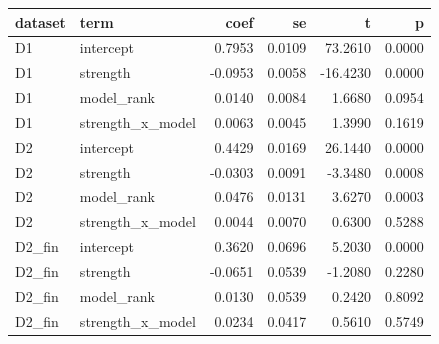 \begin{tabular}{llrrrr}
\toprule
dataset & term & coef & se & t & p \\
\midrule
D1 & intercept & 0.7953 & 0.0109 & 73.2610 & 0.0000 \\
D1 & strength & -0.0953 & 0.0058 & -16.4230 & 0.0000 \\
D1 & model\_rank & 0.0140 & 0.0084 & 1.6680 & 0.0954 \\
D1 & strength\_x\_model & 0.0063 & 0.0045 & 1.3990 & 0.1619 \\
D2 & intercept & 0.4429 & 0.0169 & 26.1440 & 0.0000 \\
D2 & strength & -0.0303 & 0.0091 & -3.3480 & 0.0008 \\
D2 & model\_rank & 0.0476 & 0.0131 & 3.6270 & 0.0003 \\
D2 & strength\_x\_model & 0.0044 & 0.0070 & 0.6300 & 0.5288 \\
D2\_fin & intercept & 0.3620 & 0.0696 & 5.2030 & 0.0000 \\
D2\_fin & strength & -0.0651 & 0.0539 & -1.2080 & 0.2280 \\
D2\_fin & model\_rank & 0.0130 & 0.0539 & 0.2420 & 0.8092 \\
D2\_fin & strength\_x\_model & 0.0234 & 0.0417 & 0.5610 & 0.5749 \\
\bottomrule
\end{tabular}
